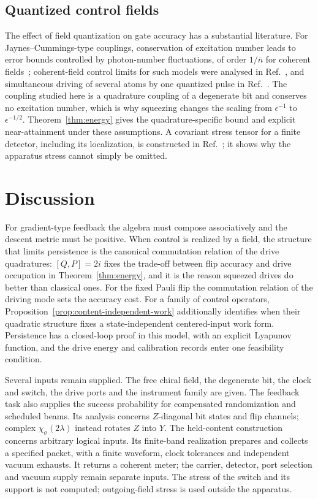 \documentclass[aps,pre,onecolumn,superscriptaddress,floatfix,longbibliography]{revtex4-2}
\begin{document}
\subsection{Quantized control fields}

The effect of field quantization on gate accuracy has a substantial literature. For Jaynes--Cummings-type couplings, conservation of excitation number leads to error bounds controlled by photon-number fluctuations, of order $1/\bar n$ for coherent fields~\cite{GeaBanaclocheOzawa2005}; coherent-field control limits for such models were analysed in Ref.~\cite{Igeta2013}, and simultaneous driving of several atoms by one quantized pulse in Ref.~\cite{Lindemann2025}. The coupling studied here is a quadrature coupling of a degenerate bit and conserves no excitation number, which is why squeezing changes the scaling from $\epsilon^{-1}$ to $\epsilon^{-1/2}$. Theorem~\ref{thm:energy} gives the quadrature-specific bound and explicit near-attainment under these assumptions. A covariant stress tensor for a finite detector, including its localization, is constructed in Ref.~\cite{Perche2025}; it shows why the apparatus stress cannot simply be omitted.

\section{Discussion}
\label{sec:discussion}

For gradient-type feedback the algebra must compose associatively and the descent metric must be positive. When control is realized by a field, the structure that limits persistence is the canonical commutation relation of the drive quadratures: $[Q,P]=2i$ fixes the trade-off between flip accuracy and drive occupation in Theorem~\ref{thm:energy}, and it is the reason squeezed drives do better than classical ones. For the fixed Pauli flip the commutation relation of the driving mode sets the accuracy cost. For a family of control operators, Proposition~\ref{prop:content-independent-work} additionally identifies when their quadratic structure fixes a state-independent centered-input work form. Persistence has a closed-loop proof in this model, with an explicit Lyapunov function, and the drive energy and calibration records enter one feasibility condition.

Several inputs remain supplied. The free chiral field, the degenerate bit, the
clock and switch, the drive ports and the instrument family are given. The
feedback task also supplies the success probability for compensated randomization
and scheduled beams. Its analysis concerns $Z$-diagonal bit states and flip
channels; complex $\chi_\sigma(2\lambda)$ instead rotates $Z$ into $Y$.
The held-content construction concerns arbitrary logical inputs. Its finite-band
realization prepares and collects a specified packet, with a finite waveform,
clock tolerances and independent vacuum exhausts. It returns a coherent meter;
the carrier, detector, port selection and vacuum supply remain separate inputs.
The stress of the switch
and its support is not computed; outgoing-field stress is used outside the apparatus.
\end{document}
